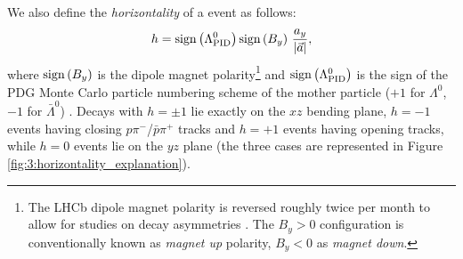 We also define the \textit{horizontality} of a \lambdadecay event as follows:
\begin{equation}
h = \operatorname{sign}{\left(\Lambda^0_\text{PID}\right)} \operatorname{sign}{\left(B_y\right)}~\frac{a_y}{\lvert \vec{a} \rvert},
\label{eq:3:horizontality}
\end{equation}
where $\operatorname{sign}{\left(B_y\right)}$ is the dipole magnet polarity\footnote{The LHCb dipole magnet polarity is reversed roughly twice per month to allow for studies on decay asymmetries \cite{Vesterinen:1642153}. The $B_y > 0$ configuration is conventionally known as \textit{magnet up} polarity, $B_y < 0$ as \textit{magnet down}.}
and $\operatorname{sign}{\left(\Lambda^0_\text{PID}\right)}$ is the sign of the PDG Monte Carlo particle numbering scheme of the mother particle ($+1$ for $\Lambda^0$, $-1$ for $\bar{\Lambda}^0$) \cite{PDG}.
Decays with $h=\pm1$ lie exactly on the $xz$ bending plane, $h=-1$ events having closing $p\pi^-$/$\bar{p}\pi^+$ tracks and $h=+1$ events having opening tracks, while $h=0$ events lie on the $yz$ plane (the three cases are represented in Figure \ref{fig:3:horizontality_explanation}).

